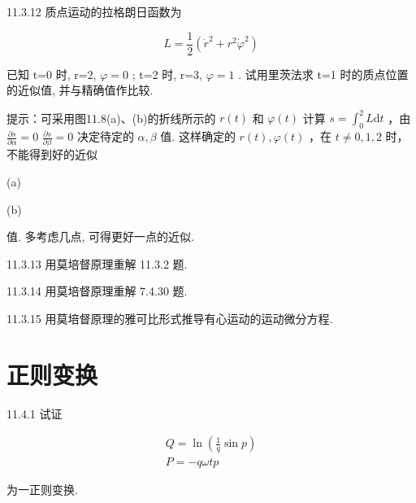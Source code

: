 \begin{problem}{11.3.12}
质点运动的拉格朗日函数为

\[
L = \frac {1}{2} (\dot {r} ^ {2} + r ^ {2} \dot {\varphi} ^ {2})
\]

已知 t=0 时, r=2, $\varphi=0$ ; t=2 时, r=3, $\varphi=1$ . 试用里茨法求 t=1 时的质点位置的近似值, 并与精确值作比较.

提示：可采用图11.8(a)、(b)的折线所示的 $r(t)$ 和 $\varphi(t)$ 计算 $s = \int_0^2 L\mathrm{d}t$ ，由 $\frac{\partial s}{\partial\alpha} = 0$ $\frac{\partial s}{\partial\beta} = 0$ 决定待定的 $\alpha, \beta$ 值. 这样确定的 $r(t), \varphi(t)$ ，在 $t \neq 0, 1, 2$ 时，不能得到好的近似

(a)

(b)

值. 多考虑几点, 可得更好一点的近似.
\begin{center}

\end{center}
\begin{center}

\end{center}
\end{problem}
\clearpage


\begin{problem}{11.3.13}
用莫培督原理重解 11.3.2 题.
\end{problem}
\clearpage


\begin{problem}{11.3.14}
用莫培督原理重解 7.4.30 题.
\begin{center}

\end{center}
\end{problem}
\clearpage


\begin{problem}{11.3.15}
用莫培督原理的雅可比形式推导有心运动的运动微分方程.
\end{problem}
\clearpage


\section{正则变换}

\begin{problem}{11.4.1}
试证

\[
\begin{array}{l} {Q = \ln \left(\frac {1}{q} \sin p\right)} \\ {P = - q \omega t p} \end{array}
\]

为一正则变换.
\end{problem}
\clearpage


